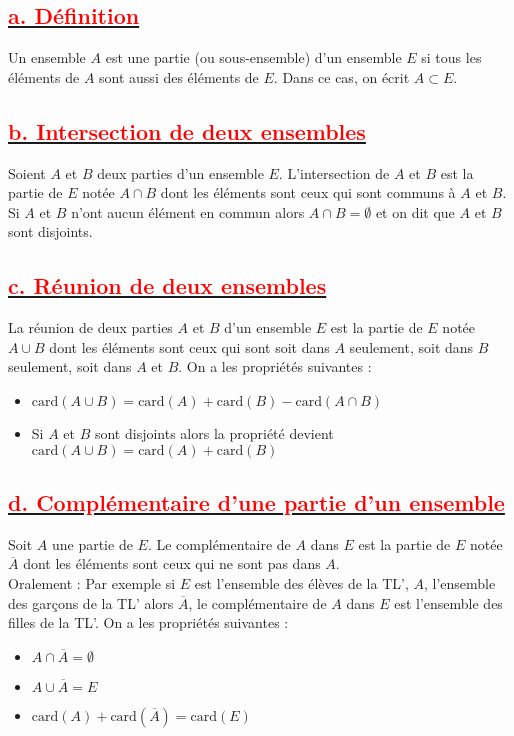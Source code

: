 \documentclass[12pt]{article}
\begin{document}
\subsection*{\underline{\textbf{\textcolor{red}{a. Définition}}}}
Un ensemble \(A\) est une partie (ou sous-ensemble) d’un ensemble \(E\) si tous les éléments de \(A\) sont aussi des éléments de \(E\). Dans ce cas, on écrit \(A \subset E\).
\subsection*{\underline{\textbf{\textcolor{red}{b. Intersection de deux ensembles}}}}
Soient \( A \) et \( B \) deux parties d’un ensemble \( E \). L’intersection de \( A \) et \( B \) est la partie de \( E \) notée \( A \cap B \) dont les éléments sont ceux qui sont communs à \( A \) et \( B \).
Si \( A \) et \( B \) n’ont aucun élément en commun alors \( A \cap B = \emptyset \) et on dit que \( A \) et \( B \) sont disjoints.
\subsection*{\underline{\textbf{\textcolor{red}{c. Réunion de deux ensembles}}}}
La réunion de deux parties \( A \) et \( B \) d’un ensemble \( E \) est la partie de \( E \) notée \( A \cup B \) dont les éléments sont ceux qui sont soit dans \( A \) seulement, soit dans \( B \) seulement, soit dans \( A \) et \( B \). On a les propriétés suivantes :
\begin{itemize}
    \item \( \text{card}(A \cup B) = \text{card}(A) + \text{card}(B) - \text{card}(A \cap B) \)
    \item Si \( A \) et \( B \) sont disjoints alors la propriété devient \( \text{card}(A \cup B) = \text{card}(A) + \text{card}(B) \)
\end{itemize}
\subsection*{\underline{\textbf{\textcolor{red}{d. Complémentaire d’une partie d’un ensemble}}}}
Soit \( A \) une partie de \( E \). Le complémentaire de \( A \) dans \( E \) est la partie de \( E \) notée \( \overline{A} \) dont les éléments sont ceux qui ne sont pas dans \( A \).\\

Oralement : Par exemple si \( E \) est l’ensemble des élèves de la TL’, \( A \), l’ensemble des garçons de la TL’ alors \( \overline{A} \), le complémentaire de \( A \) dans \( E \) est l’ensemble des filles de la TL’. On a les propriétés suivantes :
\begin{itemize}
    \item \( A \cap \overline{A} = \emptyset \)
    \item \( A \cup \overline{A} = E \)
    \item \( \text{card}(A) + \text{card}(\overline{A}) = \text{card}(E) \)
\end{itemize}
\end{document}
